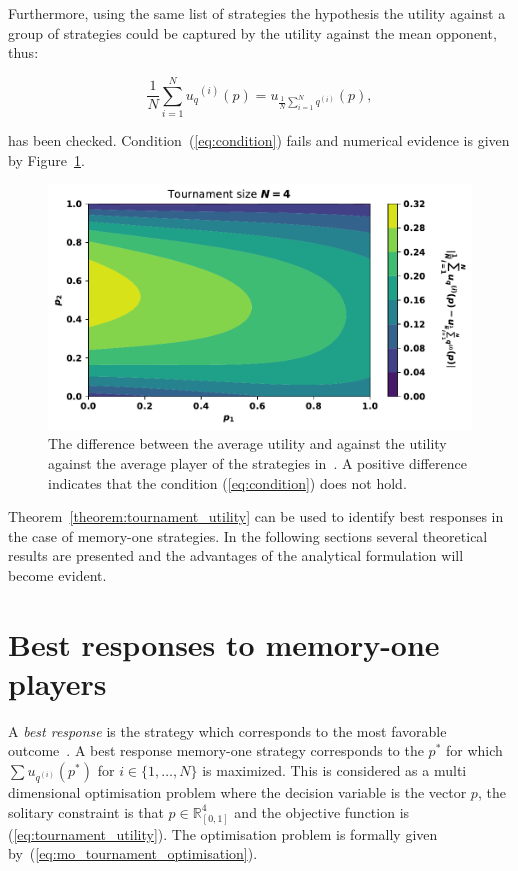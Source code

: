 \documentclass[10pt]{article}
\newcommand{\R}{\mathbb{R}}
\begin{document}
Furthermore, using the same list of strategies the 
hypothesis the utility against a group of strategies could be
captured by the utility against the mean opponent, thus:

\begin{equation}\label{eq:condition}
    \frac{1}{N} \sum_{i=1} ^ {N} {u_q}^{(i)} (p) = u_{\frac {1}{N} \sum\limits_{i=1} ^ N q^{(i)}}(p),
\end{equation}

has been checked. Condition~(\ref{eq:condition}) fails and numerical evidence is
given by Figure~\ref{fig:hypothesis}.

\begin{figure}[!htbp]
    \begin{center}
    \includegraphics[width=.5\linewidth]{img/mean_vs_average_heatmap.pdf}
    \end{center}
    \caption{The difference between the average utility and against
    the utility against the average player of the strategies in~\cite{Stewart2012}.
    A positive difference indicates that the condition (\ref{eq:condition})
    does not hold.}
    \label{fig:hypothesis}
\end{figure}

Theorem~\ref{theorem:tournament_utility} can be used to identify best
responses in the case of memory-one strategies. In the following sections several
theoretical results are presented and the advantages of the analytical formulation
will become evident.

\section{Best responses to memory-one players}\label{section:best_response_mem_one}

A \textit{best response} is the strategy which corresponds to the most
favorable outcome~\cite{Tadelis2013}. A best response memory-one strategy
corresponds to the \(p^*\) for which \(\sum u_{q ^{(i)}} (p^*)\) for \(i \in \{1, \dots, N\}\)
is maximized. This is considered as a multi dimensional optimisation problem
where the decision variable is the vector \(p\), the solitary constraint is
that \(p \in \R^4_{[0, 1]} \) and the objective function is (\ref{eq:tournament_utility}).
The optimisation problem is formally given by~(\ref{eq:mo_tournament_optimisation}).
\end{document}
